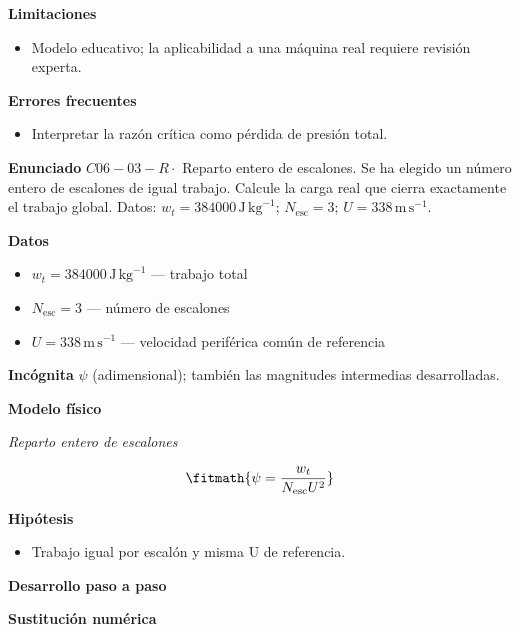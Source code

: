 \documentclass[10pt,openany]{book}
\begin{document}
\begin{tcolorbox}[title={Problema resuelto 2}, studiumworked, breakable]
\noindent\textbf{Limitaciones}
\begin{itemize}
\item Modelo educativo; la aplicabilidad a una máquina real requiere revisión experta.
\end{itemize}

\noindent\textbf{Errores frecuentes}
\begin{itemize}
\item Interpretar la razón crítica como pérdida de presión total.
\end{itemize}
\end{tcolorbox}

\begin{tcolorbox}[title={Problema resuelto 3}, studiumworked, breakable]

\noindent\textbf{Enunciado}
\(C06-03-R \cdot\) Reparto entero de escalones. Se ha elegido un número entero de escalones de igual trabajo. Calcule la carga real que cierra exactamente el trabajo global. Datos: \(w_t=384000\, \mathrm{J}\,\mathrm{kg}^{-1}\); \(N_{\mathrm{esc}}=3\); \(U=338\, \mathrm{m}\,\mathrm{s}^{-1}\).

\noindent\textbf{Datos}
\begin{itemize}
\item $w_t = 384000\,\mathrm{J}\,\mathrm{kg}^{-1}$ — trabajo total
\item $N_{\mathrm{esc}} = 3$ — número de escalones
\item $U = 338\,\mathrm{m}\,\mathrm{s}^{-1}$ — velocidad periférica común de referencia
\end{itemize}

\noindent\textbf{Incógnita}
$\psi$ (adimensional); también las magnitudes intermedias desarrolladas.

\noindent\textbf{Modelo físico}

\noindent\textit{Reparto entero de escalones}

\[
\fitmath{\psi=\frac{w_t}{N_{\mathrm{esc}} U^{2}}}
\]

\noindent\textbf{Hipótesis}
\begin{itemize}
\item Trabajo igual por escalón y misma U de referencia.
\end{itemize}

\noindent\textbf{Desarrollo paso a paso}



\noindent\textbf{Sustitución numérica}


\end{tcolorbox}
\end{document}
